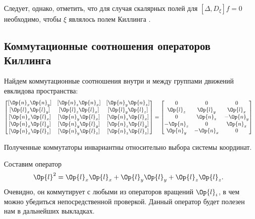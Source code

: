        Следует, однако, отметить, что для случая скалярных полей для $[\Delta, D_\xi] f = 0$ необходимо, чтобы $\xi$ являлось полем Киллинга \cite{differential_operator_commutators}.

%
%
%
%
%
%

\subsection{Коммутационные соотношения операторов Киллинга}

    Найдем коммутационные соотношения внутри и между группами движений евклидова пространства:
    \begin{equation}
        \begin{bmatrix}
            [ \Op{n}_x \Op{n}_y ] & [ \Op{n}_z \Op{n}_x ] & [ \Op{n}_y \Op{n}_z ] \\
            [ \Op{l}_x \Op{l}_y ] & [ \Op{l}_z \Op{l}_x ] & [ \Op{l}_y \Op{l}_z ] \\
            [ \Op{n}_x \Op{l}_x ] & [ \Op{n}_y \Op{l}_x ] & [ \Op{n}_z \Op{l}_x ] \\
            [ \Op{n}_x \Op{l}_y ] & [ \Op{n}_y \Op{l}_y ] & [ \Op{n}_z \Op{l}_y ] \\
            [ \Op{n}_x \Op{l}_z ] & [ \Op{n}_y \Op{l}_z ] & [ \Op{n}_z \Op{l}_z ]
        \end{bmatrix}
        =
        \begin{bmatrix}
            0          &   0        &   0        \\
                \Op{l}_z &   \Op{l}_y &   \Op{l}_x \\
            0          &   \Op{n}_z & - \Op{n}_y \\
            - \Op{n}_z &   0        &   \Op{n}_x \\
                \Op{n}_y & - \Op{n}_x &   0
        \end{bmatrix}
    \end{equation}

    Полученные коммутаторы инвариантны относительно выбора системы координат.

    Составим оператор
    \begin{equation}
        \Op{l}^2 = \Op{l}_x \Op{l}_x + \Op{l}_y \Op{l}_y + \Op{l}_z \Op{l}_z .
    \end{equation}
    Очевидно, он коммутирует с любыми из операторов вращений $\Op{l}_i$, в чем можно убедиться непосредственной проверкой. Данный оператор будет полезен нам в дальнейших выкладках.

